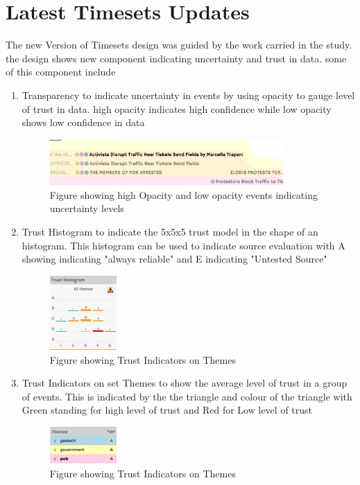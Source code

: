 \documentclass[journal]{vgtc}                %
\begin{document}
\section{Latest Timesets Updates}

The new Version of Timesets design was guided by the work carried in the study. the design shows new component indicating uncertainty and trust in data. some of this component include 


\begin{enumerate}
  \item Transparency to indicate uncertainty in events by using opacity to gauge level of trust in data. high opacity indicates high confidence while low opacity shows low confidence in data
  	\begin{figure}[htb]
 	\centering
 	\includegraphics[width=3.5in]{img/transparency}
 	\caption{ Figure showing high Opacity and low opacity events indicating uncertainty levels}
	\end{figure}

  \item Trust Histogram to indicate the 5x5x5 trust model in the shape of an histogram. This histogram can be used to indicate source evaluation with A showing indicating "always reliable"  and E indicating "Untested Source"
  \begin{figure}[h!]
 	\centering
 	\includegraphics[width=1.0in]{img/histogram}
 	\caption{ Figure showing Trust Indicators on Themes}
	\end{figure}
  
  \item Trust Indicators on set Themes to show the average level of trust in a group of events. This is indicated by the the triangle and colour of the triangle with Green standing for high level of trust and Red for Low level of trust  
  	\begin{figure}[htb]
 	\centering
 	\includegraphics[width=1.0in]{img/themes}
 	\caption{ Figure showing Trust Indicators on Themes}
	\end{figure}
	

\end{enumerate}
\end{document}
